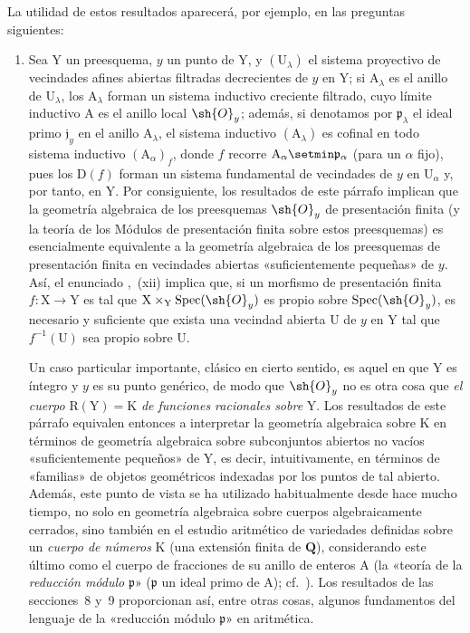 \begin{env}[8.1.2]
\label{IV.8.1.2}
La utilidad de estos resultados aparecerá, por ejemplo, en las preguntas siguientes:
\begin{enumerate}[label=\emph{\alph*)}]
  \item
  Sea $\mathrm{Y}$ un preesquema, $y$ un punto de $\mathrm{Y}$, y $(\mathrm{U}_\lambda)$ el sistema proyectivo de vecindades afines abiertas filtradas decrecientes de $y$ en $\mathrm{Y}$; si $\mathrm{A}_\lambda$ es el anillo de $\mathrm{U}_\lambda$, los $\mathrm{A}_\lambda$ forman un sistema inductivo creciente filtrado, cuyo límite inductivo $\mathrm{A}$ es el anillo local $\sh{O}_y$; además, si denotamos por $\mathfrak{p}_\lambda$ el ideal primo $\mathfrak{j}_y$ en el anillo $\mathrm{A}_\lambda$, el sistema inductivo $(\mathrm{A}_\lambda)$ es cofinal en todo sistema inductivo $(\mathrm{A}_\alpha)_f$, donde $f$ recorre $\mathrm{A}_\alpha\setmin\mathfrak{p}_\alpha$
(para un $\alpha$ fijo), pues los $\mathrm{D}(f)$ forman un sistema fundamental de vecindades de $y$ en $\mathrm{U}_\alpha$ y, por tanto, en $\mathrm{Y}$.
Por consiguiente, los resultados de este párrafo implican que la geometría algebraica de los preesquemas $\sh{O}_y$ de presentación finita (y la teoría de los Módulos de presentación finita sobre estos preesquemas) es esencialmente equivalente a la geometría algebraica de los preesquemas de presentación finita en vecindades abiertas «suficientemente pequeñas» de $y$.
Así, el enunciado ,~(xii) implica que, si un morfismo de presentación finita $f:\mathrm{X}\to\mathrm{Y}$ es tal que $\mathrm{X}\times_\mathrm{Y}\operatorname{Spec}(\sh{O}_y)$ es propio sobre $\operatorname{Spec}(\sh{O}_y)$, es necesario y suficiente que exista una vecindad abierta $\mathrm{U}$ de $y$ en $\mathrm{Y}$ tal que $f^{-1}(\mathrm{U})$ sea propio sobre $\mathrm{U}$.

Un caso particular importante, clásico en cierto sentido, es aquel en que $\mathrm{Y}$ es íntegro y $y$ es su punto genérico, de modo que $\sh{O}_y$ no es otra cosa que \emph{el cuerpo} $\mathrm{R}(\mathrm{Y})=\mathrm{K}$ \emph{de funciones racionales sobre} $\mathrm{Y}$.
Los resultados de este párrafo equivalen entonces a interpretar la geometría algebraica sobre $\mathrm{K}$ en términos de geometría algebraica sobre subconjuntos abiertos no vacíos «suficientemente pequeños» de $\mathrm{Y}$, es decir, intuitivamente, en términos de «familias» de objetos geométricos indexadas por los puntos de tal abierto.
Además, este punto de vista se ha utilizado habitualmente desde hace mucho tiempo, no solo en geometría algebraica sobre cuerpos algebraicamente cerrados, sino también en el estudio aritmético de variedades definidas sobre un \emph{cuerpo de números} $\mathrm{K}$ (una extensión finita de $\mathbf{Q}$), considerando este último como el cuerpo de fracciones de su anillo de enteros $\mathrm{A}$ (la «teoría de la \emph{reducción módulo} $\mathfrak{p}$» ($\mathfrak{p}$ un ideal primo de $\mathrm{A}$); cf.\ ).
Los resultados de las secciones \textsection\textsection\,8 y~9 proporcionan así, entre otras cosas, algunos fundamentos del lenguaje de la «reducción módulo $\mathfrak{p}$» en aritmética.


\end{enumerate}
\end{env}
